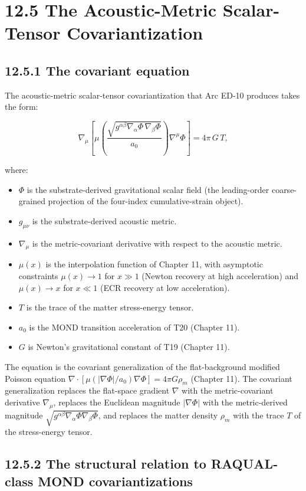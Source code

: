 \documentclass[11pt]{book}
\begin{document}
\section{12.5 The Acoustic-Metric Scalar-Tensor Covariantization}

\subsection{12.5.1 The covariant equation}

The acoustic-metric scalar-tensor covariantization that Arc ED-10 produces takes the form:

\[
\nabla_\mu\!\left[\mu\!\left(\frac{\sqrt{g^{\alpha\beta}\nabla_\alpha\Phi\,\nabla_\beta\Phi}}{a_0}\right)\nabla^\mu\Phi\right] = 4\pi\,G\,T,
\]

where:
\begin{itemize}
\item $\Phi$ is the substrate-derived gravitational scalar field (the leading-order coarse-grained projection of the four-index cumulative-strain object).
\item $g_{\mu\nu}$ is the substrate-derived acoustic metric.
\item $\nabla_\mu$ is the metric-covariant derivative with respect to the acoustic metric.
\item $\mu(x)$ is the interpolation function of Chapter 11, with asymptotic constraints $\mu(x) \to 1$ for $x \gg 1$ (Newton recovery at high acceleration) and $\mu(x) \to x$ for $x \ll 1$ (ECR recovery at low acceleration).
\item $T$ is the trace of the matter stress-energy tensor.
\item $a_0$ is the MOND transition acceleration of T20 (Chapter 11).
\item $G$ is Newton's gravitational constant of T19 (Chapter 11).
\end{itemize}

The equation is the covariant generalization of the flat-background modified Poisson equation $\nabla\cdot[\mu(|\nabla\Phi|/a_0)\nabla\Phi] = 4\pi G\rho_m$ (Chapter 11). The covariant generalization replaces the flat-space gradient $\nabla$ with the metric-covariant derivative $\nabla_\mu$, replaces the Euclidean magnitude $|\nabla\Phi|$ with the metric-derived magnitude $\sqrt{g^{\alpha\beta}\nabla_\alpha\Phi\nabla_\beta\Phi}$, and replaces the matter density $\rho_m$ with the trace $T$ of the stress-energy tensor.

\subsection{12.5.2 The structural relation to RAQUAL-class MOND covariantizations}
\end{document}
